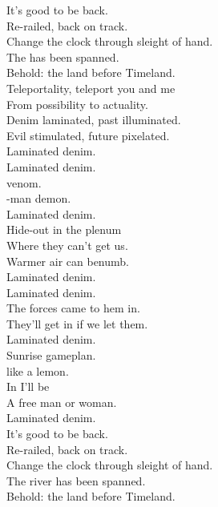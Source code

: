 
\label{album:laminated-denim}





It's good to be back. \\
Re-railed, back on track. \\
Change the clock through sleight of hand. \\
The  has been spanned. \\
Behold: the land before Timeland. \\

Teleportality, teleport you and me \\
From possibility to actuality. \\
Denim laminated, past illuminated. \\
Evil stimulated, future pixelated. \\

Laminated denim. \\

Laminated denim. \\
 venom. \\
-man demon. \\
Laminated denim. \\
Hide-out in the plenum \\
Where they can't get us. \\
Warmer air can benumb. \\
Laminated denim. \\

Laminated denim. \\
The forces came to hem in. \\
They'll get in if we let them. \\
Laminated denim. \\
Sunrise gameplan. \\
 like a lemon. \\
In  I'll be \\
A free man or woman. \\
Laminated denim. \\

It's good to be back. \\
Re-railed, back on track. \\
Change the clock through sleight of hand. \\
The river has been spanned. \\
Behold: the land before Timeland. \\

